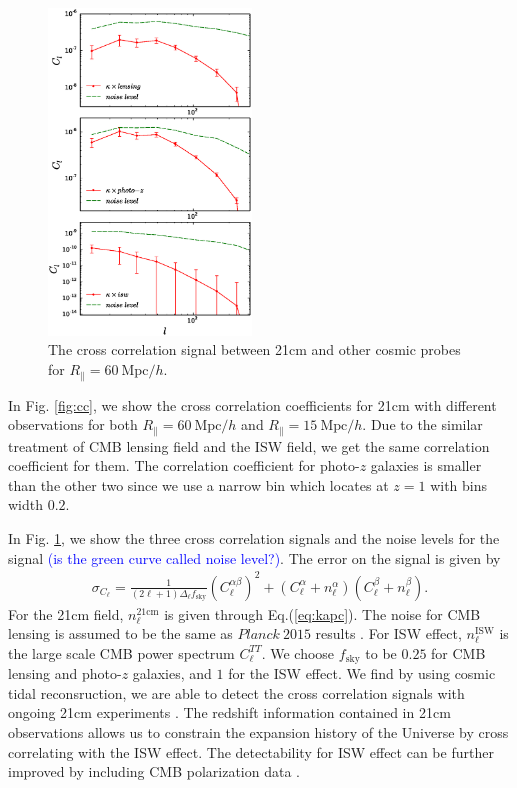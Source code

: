\documentclass[aps,prl,twocolumn,showpacs,superscriptaddress,groupedaddress,nofootinbib]{revtex4}  %
\newcommand{\mr}{\mathrm}
\newcommand{\tcb}{\textcolor{blue}}
\begin{document}
\begin{figure}[tbp]
\begin{center}
\includegraphics[width=0.48\textwidth]{f8.eps}
\end{center}
\vspace{-1.9cm}
\caption{The cross correlation signal between 21cm and other cosmic probes for
$R_\parallel=60\ \mr{Mpc}/h$.}
\label{fig:cs}
\end{figure}

In Fig. \ref{fig:cc}, we show the cross correlation coefficients for 21cm with 
different observations for both $R_\parallel=60\ \mr{Mpc}/h$ and 
$R_\parallel=15\ \mr{Mpc}/h$. Due to the similar treatment of CMB lensing field
and the ISW field, we get the same correlation coefficient for them. 
The correlation coefficient for photo-$z$ galaxies is smaller than the other
two since we use a narrow bin which locates at $z=1$ with bins width $0.2$.

In Fig. \ref{fig:cs}, we show the three cross correlation signals and the noise
levels for the signal \tcb{(is the green curve called noise level?)}. The error
on the signal is given by
\begin{eqnarray}
\sigma_{C_\ell}=\frac{1}{(2\ell+1)\Delta_\ell f_\mr{sky}}
{(C_\ell^{\alpha\beta})^2+(C_\ell^{\alpha}+n_\ell^{\alpha})
(C_\ell^{\beta}+n_\ell^{\beta})}.
\end{eqnarray}
For the 21cm field, $n_\ell^\mr{21cm}$ is given through Eq.(\ref{eq:kapc}). 
The noise for CMB lensing is assumed to be the same as $Planck\ 2015$ results 
\cite{2015:plancklensing}. For ISW effect, $n_\ell^\mr{ISW}$ is the large scale
CMB power spectrum $C_\ell^{TT}$. We choose $f_\mr{sky}$ to be $0.25$ for 
CMB lensing and photo-$z$ galaxies, and $1$ for the ISW effect. We find by
using cosmic tidal reconsruction, we are able to detect the cross correlation
signals with ongoing 21cm experiments \cite{2014SPIE.9145E..22B,2014SPIE.9145E..4VN,2012IJMPS..12..256C,2015ApJ...798...40X}. 
The redshift information contained in 21cm observations allows us to constrain
the expansion history of the Universe by cross correlating with the ISW effect.
The detectability for ISW effect can be further improved by including CMB 
polarization data \cite{2011PhRvD..83f3001L}.
\end{document}
